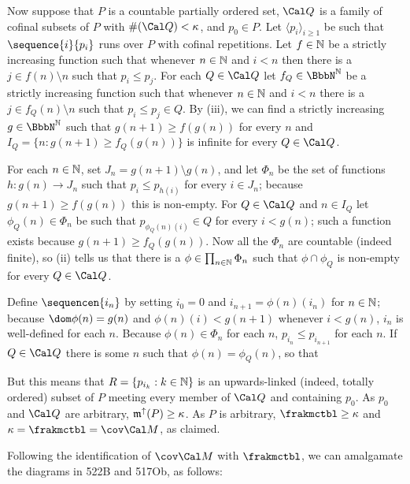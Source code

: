{\medskip

 Now suppose that $P$ is a countable partially ordered
set, $\Cal Q$ is a family of cofinal subsets of $P$ with
$\#(\Cal Q)<\kappa$, and $p_0\in P$.   Let $\langle p_i\rangle_{i\ge 1}$
be such that $\sequence{i}{p_i}$ runs over $P$ with cofinal repetitions.
Let $f\in\Bbb N$ be a  strictly increasing function such that whenever
$n\in\Bbb N$ and $i<n$ then there is a $j\in f(n)\setminus n$ such that
$p_i\le p_j$.   For each $Q\in\Cal Q$ let $f_Q\in\NN$ be a strictly
increasing function such that whenever $n\in\Bbb N$ and $i<n$ there is a
$j\in f_Q(n)\setminus n$ such that $p_i\le p_j\in Q$.   By (iii), we can
find a strictly increasing $g\in\NN$ such that
$g(n+1)\ge f(g(n))$ for every $n$ and $I_Q=\{n:g(n+1)\ge f_Q(g(n))\}$ is
infinite for every $Q\in\Cal Q$.

For each $n\in\Bbb N$, set $J_n=g(n+1)\setminus g(n)$, and let $\Phi_n$
be the set of functions $h:g(n)\to J_n$ such that
$p_i\le p_{h(i)}$ for every $i\in J_n$;  because
$g(n+1)\ge f(g(n))$ this is non-empty.   For $Q\in\Cal Q$ and $n\in I_Q$
let $\phi_Q(n)\in\Phi_n$ be such that $p_{\phi_Q(n)(i)}\in Q$ for every
$i<g(n)$;  such a function exists because $g(n+1)\ge f_Q(g(n))$.   Now
all the $\Phi_n$ are countable (indeed finite), so (ii) tells us that
there is a $\phi\in\prod_{n\in\Bbb N}\Phi_n$ such that $\phi\cap\phi_Q$
is non-empty for every $Q\in\Cal Q$.

Define $\sequencen{i_n}$ by setting $i_0=0$ and $i_{n+1}=\phi(n)(i_n)$
for $n\in\Bbb N$;  because $\dom\phi(n)=g(n)$ and $\phi(n)(i)<g(n+1)$
whenever $i<g(n)$, $i_n$ is well-defined for each $n$.   Because
$\phi(n)\in\Phi_n$ for each $n$, $p_{i_n}\le p_{i_{n+1}}$ for each $n$.
If $Q\in\Cal Q$ there is some $n$ such that $\phi(n)=\phi_Q(n)$, so that


\noindent But this means that $R=\{p_{i_k}:k\in\Bbb N\}$ is an
upwards-linked (indeed, totally ordered) subset of $P$ meeting every
member of $\Cal Q$ and containing $p_0$.   As $p_0$ and $\Cal Q$ are
arbitrary, $\frak m^{\uparrow}(P)\ge\kappa$.   As $P$ is arbitrary,
$\frakmctbl\ge\kappa$ and $\kappa=\frakmctbl=\cov\Cal M$, as claimed.
}%

 Following the identification of
$\cov\Cal M$ with $\frakmctbl$, we can amalgamate the diagrams in 522B
and 517Ob, as follows:

